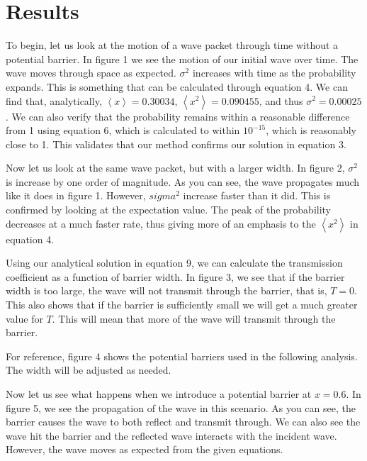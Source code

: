 \documentclass[pra,twocolumn,showpacs,amsmath,amssymb]{revtex4-2}
\begin{document}
\section{Results} \label{sec:results}

To begin, let us look at the motion of a wave packet through time without a potential barrier. In figure 1 we see the motion of our initial wave over time. The wave moves through space as expected. $\sigma^2$ increases with time as the probability expands. This is something that can be calculated through equation 4. We can find that, analytically, $\left\langle x \right\rangle = 0.30034$, $\left\langle x^2 \right\rangle = 0.090455$, and thus $\sigma^2 = 0.00025$. We can also verify that the probability remains within a reasonable difference from 1 using equation 6, which is calculated to within $10^{-15}$, which is reasonably close to 1. This validates that our method confirms our solution in equation 3.
\par Now let us look at the same wave packet, but with a larger width. In figure 2, $\sigma^2$ is increase by one order of magnitude. As you can see, the wave propagates much like it does in figure 1. However, $sigma^2$ increase faster than it did. This is confirmed by looking at the expectation value. The peak of the probability decreases at a much faster rate, thus giving more of an emphasis to the $\left\langle x^2 \right\rangle$ in equation 4.
\par Using our analytical solution in equation 9, we can calculate the transmission coefficient as a function of barrier width. In figure 3, we see that if the barrier width is too large, the wave will not transmit through the barrier, that is, $T = 0$. This also shows that if the barrier is sufficiently small we will get a much greater value for $T$. This will mean that more of the wave will transmit through the barrier.
\par For reference, figure 4 shows the potential barriers used in the following analysis. The width will be adjusted as needed.
\par Now let us see what happens when we introduce a potential barrier at $x = 0.6$. In figure 5, we see the propagation of the wave in this scenario. As you can see, the barrier causes the wave to both reflect and transmit through. We can also see the wave hit the barrier and the reflected wave interacts with the incident wave. However, the wave moves as expected from the given equations.
\end{document}
